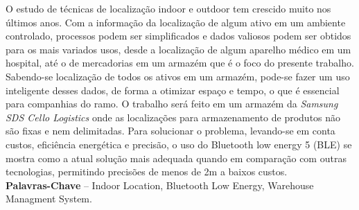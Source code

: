 \documentclass[]{politex}
\begin{document}
\capa
\folhaderosto














\begin{resumo}
O estudo de técnicas de localização indoor e outdoor tem crescido muito nos últimos anos. Com a informação da localização de algum ativo em um ambiente controlado, processos podem ser simplificados e dados valiosos podem ser obtidos para os mais variados usos, desde a localização de algum aparelho médico em um hospital, até o de mercadorias em um armazém que é o foco do presente trabalho. Sabendo-se localização de todos os ativos em um armazém, pode-se fazer um uso inteligente desses dados, de forma a otimizar espaço e tempo, o que é essencial para companhias do ramo. 
O trabalho será feito em um armazém da \textit{Samsung SDS Cello Logistics} onde as localizações para armazenamento de produtos não são fixas e nem delimitadas. Para solucionar o problema, levando-se em conta custos, eficiência energética e precisão, o uso do Bluetooth low energy 5 (BLE) se mostra como a atual solução mais adequada quando em comparação com outras tecnologias, permitindo precisões de menos de 2m a baixos custos.
%
\\[3\baselineskip]
%
\textbf{Palavras-Chave} -- Indoor Location, Bluetooth Low Energy, Warehouse Managment System.
\end{resumo}
\end{document}
